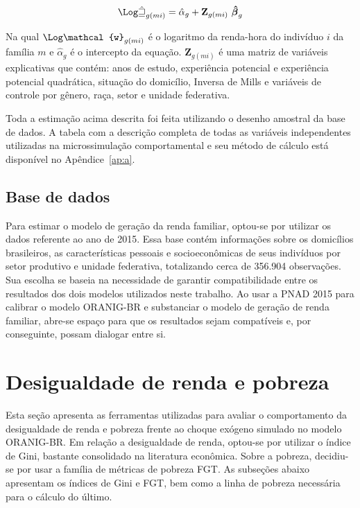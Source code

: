 \begin{align}
	\mathbf{\Log \mathcal{\hat{w}}}_{g(mi)} = \hat{\alpha}_g + \mathbf{Z}_{g(mi)} \ \boldsymbol{\hat{\beta}}_g \label{eq:step2}
\end{align}

Na qual $\mathbf{\Log \mathcal{w}}_{g(mi)}$ é o logaritmo da renda-hora do indivíduo $i$ da família $m$ e $\hat{\alpha}_g$ é o intercepto da equação. $\mathbf{Z}_{g(mi)}$ é uma matriz de variáveis explicativas que contém: anos de estudo, experiência potencial e experiência potencial quadrática, situação do domicílio, Inversa de Mills e variáveis de controle por gênero, raça, setor e unidade federativa.

Toda a estimação acima descrita foi feita utilizando o desenho amostral da base de dados. A tabela com a descrição completa de todas as variáveis independentes utilizadas na microssimulação comportamental e seu método de cálculo está disponível no Apêndice~\ref{ap:a}.


\subsection{Base de dados} \label{subsec:dados_microssimulacao}

Para estimar o modelo de geração da renda familiar, optou-se por utilizar os dados  referente ao ano de 2015. Essa base contém informações	sobre os domicílios brasileiros, as características pessoais e socioeconômicas de seus indivíduos por setor produtivo e unidade federativa, totalizando cerca de 356.904 observações. Sua escolha se baseia na necessidade de garantir compatibilidade entre os resultados dos dois modelos utilizados neste trabalho. Ao usar a PNAD 2015 para calibrar o modelo ORANIG-BR e substanciar o modelo de geração de renda familiar, abre-se espaço para que os resultados sejam compatíveis e, por conseguinte, possam dialogar entre si.



\section{Desigualdade de renda e pobreza} \label{sec:desigualdade_pobreza}

Esta seção apresenta as ferramentas utilizadas para avaliar o comportamento da desigualdade de renda e pobreza frente ao choque exógeno simulado no modelo ORANIG-BR. Em relação a desigualdade de renda, optou-se por utilizar o índice de Gini, bastante consolidado na literatura econômica. Sobre a pobreza, decidiu-se por usar a família de métricas de pobreza FGT. As subseções abaixo apresentam os índices de Gini e FGT, bem como a linha de pobreza necessária para o cálculo do último.

